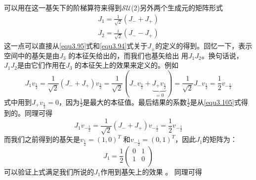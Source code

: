 可以用在这一基矢下的阶梯算符来得到$\mathcal{SU}$(2)另外两个生成元的矩阵形式
\begin{align}\label{equ3.115}
  J_1=\frac{1}{\sqrt{2}}(J_-+J_+) \\
\label{equ3.116}
  J_2=\frac{i}{\sqrt{2}}(J_--J_+)
\end{align}
这一点可以直接从\ref{equ3.95}式和\ref{equ3.94}式关于$J_\pm$的定义的得到。回忆一下，表示空间中的基矢是由$J_3$ 的本征矢给出的，而我们也基矢给出 用$J_1J_2$。换句话说，$J_1J_2$是由它们作用在$J_3$ 的本征矢上的效果来定义的。例如
\begin{equation}\label{equ3.117}
  J_1v_\frac{1}{2}
  =\frac{1}{\sqrt{2}}
  (J_-+J_+)v_\frac{1}{2}
  =\frac{1}{\sqrt{2}}
  (J_-v_\frac{1}{2}
  +\underbrace{J_+v_\frac{1}{2}}_{=0})
  =\frac{1}{\sqrt{2}}J_-v_\frac{1}{2}
  =\frac{1}{2}v_{-\frac{1}{2}}
\end{equation}
式中用到$J_+v_\frac{1}{2}=0$，因为$\frac{1}{2}$是最大的本征值。最后结果的系数$\frac{1}{2}$是从\ref{equ3.105}式得到的。同理可得
\begin{equation}\label{equ3.118}
  J_1 v_{-\frac{1}{2}}=\frac{1}{\sqrt{2}}(J_-+J_+)v_{-\frac{1}{2}}=\frac{1}{2}v_{-\frac{1}{2}}
\end{equation}
而我们之前得到的基矢是$v_\frac{1}{2}=(1,0)^{{T}}$ 和$v_{-\frac{1}{2}}=(0,1)^{{T}}$，因此$J_1$的矩阵为：
\begin{equation}\label{equ3.119}
  J_1=\frac{1}{2}\left(
                   \begin{array}{cc}
                     0 & 1 \\
                     1 & 0 \\
                   \end{array}
                 \right)
\end{equation}
可以验证上式满足我们所说的$J_1$作用到基矢上的效果
。 同理可得

